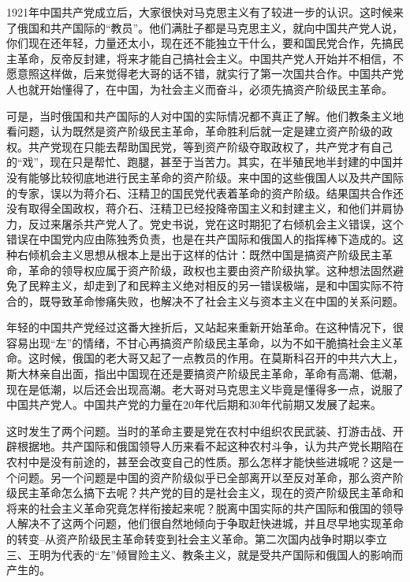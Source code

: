 \documentclass[UTF8, 12pt, a4paper]{ctexrep}
\begin{document}
1921年中国共产党成立后，大家很快对马克思主义有了较进一步的认识。这时候来了俄国和共产国际的“教员”。他们满肚子都是马克思主义，就向中国共产党人说，你们现在还年轻，力量还太小，现在还不能独立干什么，要和国民党合作，先搞民主革命，反帝反封建，将来才能自己搞社会主义。中国共产党人开始并不相信，不愿意照这样做，后来觉得老大哥的话不错，就实行了第一次国共合作。中国共产党人也就开始懂得了，在中国，为社会主义而奋斗，必须先搞资产阶级民主革命。

可是，当时俄国和共产国际的人对中国的实际情况都不真正了解。他们教条主义地看问题，认为既然是资产阶级民主革命，革命胜利后就一定是建立资产阶级的政权。共产党现在只能去帮助国民党，等到资产阶级夺取政权了，共产党才有自己的“戏”，现在只是帮忙、跑腿，甚至于当苦力。其实，在半殖民地半封建的中国并没有能够比较彻底地进行民主革命的资产阶级。来中国的这些俄国人以及共产国际的专家，误以为蒋介石、汪精卫的国民党代表着革命的资产阶级。结果国共合作还没有取得全国政权，蒋介石、汪精卫已经投降帝国主义和封建主义，和他们并肩协力，反过来屠杀共产党人了。党史书说，党在这时期犯了右倾机会主义错误，这个错误在中国党内应由陈独秀负责，也是在共产国际和俄国人的指挥棒下造成的。这种右倾机会主义思想从根本上是出于这样的估计：既然中国是搞资产阶级民主革命，革命的领导权应属于资产阶级，政权也主要由资产阶级执掌。这种想法固然避免了民粹主义，却走到了和民粹主义绝对相反的另一错误极端，是和中国实际不符合的，既导致革命惨痛失败，也解决不了社会主义与资本主义在中国的关系问题。

年轻的中国共产党经过这番大挫折后，又站起来重新开始革命。在这种情况下，很容易出现“左”的情绪，不甘心再搞资产阶级民主革命，以为不如干脆搞社会主义革命。这时候，俄国的老大哥又起了一点教员的作用。在莫斯科召开的中共六大上，斯大林亲自出面，指出中国现在还是要搞资产阶级民主革命，革命有高潮、低潮，现在是低潮，以后还会出现高潮。老大哥对马克思主义毕竟是懂得多一点，说服了中国共产党人。中国共产党的力量在20年代后期和30年代前期又发展了起来。

这时发生了两个问题。当时的革命主要是党在农村中组织农民武装、打游击战、开辟根据地。共产国际和俄国领导人历来看不起这种农村斗争，认为共产党长期陷在农村中是没有前途的，甚至会改变自己的性质。那么怎样才能快些进城呢？这是一个问题。另一个问题是中国的资产阶级似乎已全部离开以至反对革命，那么资产阶级民主革命怎么搞下去呢？共产党的目的是社会主义，现在的资产阶级民主革命和将来的社会主义革命究竟怎样衔接起来呢？脱离中国实际的共产国际和俄国的领导人解决不了这两个问题，他们很自然地倾向于争取赶快进城，并且尽早地实现革命的转变--从资产阶级民主革命转变到社会主义革命。第二次国内战争时期以李立三、王明为代表的“左”倾冒险主义、教条主义，就是受共产国际和俄国人的影响而产生的。
\end{document}
